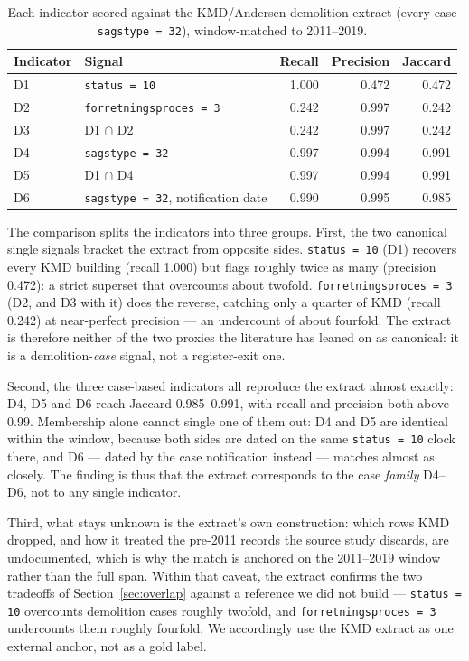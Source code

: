 \begin{table}[htbp]
\centering
\caption{Each indicator scored against the KMD/Andersen demolition extract
(every case \texttt{sagstype = 32}), window-matched to 2011--2019.}
\label{tab:kmd}
\begin{tabular}{llrrr}
\toprule
Indicator & Signal & Recall & Precision & Jaccard \\
\midrule
D1 & \texttt{status = 10}              & 1.000 & 0.472 & 0.472 \\
D2 & \texttt{forretningsproces = 3}    & 0.242 & 0.997 & 0.242 \\
D3 & D1 $\cap$ D2                      & 0.242 & 0.997 & 0.242 \\
D4 & \texttt{sagstype = 32}            & 0.997 & 0.994 & 0.991 \\
D5 & D1 $\cap$ D4                      & 0.997 & 0.994 & 0.991 \\
D6 & \texttt{sagstype = 32}, notification date & 0.990 & 0.995 & 0.985 \\
\bottomrule
\end{tabular}
\end{table}

The comparison splits the indicators into three groups. First, the two
canonical single signals bracket the extract from opposite sides.
\texttt{status = 10} (D1) recovers every KMD building (recall 1.000) but
flags roughly twice as many (precision 0.472): a strict superset that
overcounts about twofold. \texttt{forretningsproces = 3} (D2, and D3 with
it) does the reverse, catching only a quarter of KMD (recall 0.242) at
near-perfect precision --- an undercount of about fourfold. The extract is
therefore neither of the two proxies the literature has leaned on as
canonical: it is a demolition-\emph{case} signal, not a register-exit one.

Second, the three case-based indicators all reproduce the extract almost
exactly: D4, D5 and D6 reach Jaccard 0.985--0.991, with recall and
precision both above 0.99. Membership alone cannot single one of them out:
D4 and D5 are identical within the window, because both sides are dated on
the same \texttt{status = 10} clock there, and D6 --- dated by the case
notification instead --- matches almost as closely. The finding is thus
that the extract corresponds to the case \emph{family} D4--D6, not to any
single indicator.

Third, what stays unknown is the extract's own construction: which rows KMD
dropped, and how it treated the pre-2011 records the source study discards,
are undocumented, which is why the match is anchored on the 2011--2019
window rather than the full span. Within that caveat, the extract confirms
the two tradeoffs of Section~\ref{sec:overlap} against a reference we did
not build --- \texttt{status = 10} overcounts demolition cases roughly
twofold, and \texttt{forretningsproces = 3} undercounts them roughly
fourfold. We accordingly use the KMD extract as one external anchor, not as
a gold label.

